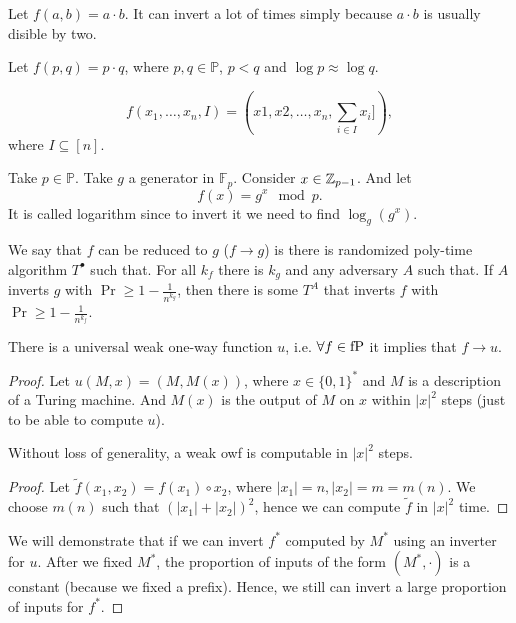 \begin{example}
    Let $f(a, b) = a \cdot b$.
    It can invert a lot of times simply because $a \cdot b$ is usually disible by two.
\end{example}

\begin{example}
    Let $f(p, q) = p \cdot q$, where $p, q \in \mathbb P$, $p < q$ and $\log p \approx \log q$.
\end{example}

\begin{example}
    \[
        f(x_1, \ldots, x_n, I) = (x1, x2, \ldots, x_n, \sum_{i \in I} x_i]),
    \] where $I \subseteq [n]$.
\end{example}

\begin{example}
    Take $p \in \mathbb P$.
    Take $g$ a generator in $\mathbb F_p$.
    Consider $x \in \mathbb{Z}_{p - 1}$.
    And let
    \[
        f(x) = g^x \mod p.
    \]
    It is called logarithm since to invert it we need to find $\log_g(g^x)$.
\end{example}

\begin{definition}
    We say that $f$ can be reduced to $g$ ($f \to g$) is there is randomized poly-time algorithm $T^{\bullet}$ such that.
    For all $k_f$ there is $k_g$ and any adversary $A$ such that.
    If $A$ inverts $g$ with $\Pr \geq 1 - \frac{1}{n^{k_g}}$, then there is some $T^A$ that inverts $f$ with $\Pr \geq 1 - \frac{1}{n^{k_f}}$.
\end{definition}

\begin{theorem}
    There is a universal weak one-way function $u$, i.e. $\forall f \in \operatorname{fP}$ it implies that $f \to u$.
\end{theorem}
\begin{proof}
    Let $u(M, x) = (M, M(x))$, where $x \in \{0, 1\}^*$ and $M$ is a description of a Turing machine.
    And $M(x)$ is the output of $M$ on $x$ within $|x|^2$ steps (just to be able to compute $u$).
    \begin{lemma}
        Without loss of generality, a weak owf is computable in $|x|^2$ steps.
    \end{lemma}
    \begin{proof}
        Let $\tilde f(x_1, x_2) = f(x_1) \circ x_2$, where $|x_1| = n, |x_2| = m = m(n)$.
        We choose $m(n)$ such that $(|x_1| + |x_2|)^2$, hence we can compute $\tilde f$ in $|x|^2$ time.
    \end{proof}

    We will demonstrate that if we can invert $f^*$ computed by $M^*$ using an inverter for $u$.
    After we fixed $M^*$, the proportion of inputs of the form $(M^*, \cdot)$ is a constant (because we fixed a prefix).
    Hence, we still can invert a large proportion of inputs for $f^*$.
\end{proof}

